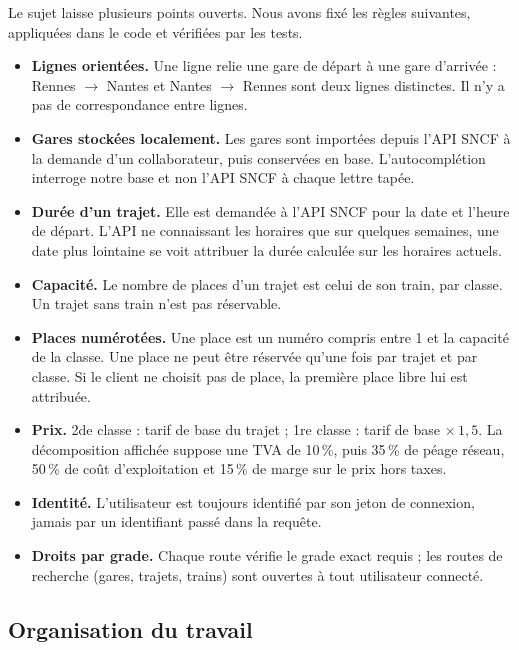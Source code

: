 \documentclass[11pt,a4paper]{article}
\begin{document}
Le sujet laisse plusieurs points ouverts. Nous avons fixé les règles suivantes, appliquées dans le
code et vérifiées par les tests.

\begin{itemize}[itemsep=2pt]
  \item \textbf{Lignes orientées.} Une ligne relie une gare de départ à une gare d'arrivée :
        Rennes $\rightarrow$ Nantes et Nantes $\rightarrow$ Rennes sont deux lignes distinctes.
        Il n'y a pas de correspondance entre lignes.
  \item \textbf{Gares stockées localement.} Les gares sont importées depuis l'API SNCF à la demande
        d'un collaborateur, puis conservées en base. L'autocomplétion interroge notre base et non
        l'API SNCF à chaque lettre tapée.
  \item \textbf{Durée d'un trajet.} Elle est demandée à l'API SNCF pour la date et l'heure de
        départ. L'API ne connaissant les horaires que sur quelques semaines, une date plus lointaine
        se voit attribuer la durée calculée sur les horaires actuels.
  \item \textbf{Capacité.} Le nombre de places d'un trajet est celui de son train, par classe. Un
        trajet sans train n'est pas réservable.
  \item \textbf{Places numérotées.} Une place est un numéro compris entre 1 et la capacité de la
        classe. Une place ne peut être réservée qu'une fois par trajet et par classe. Si le client
        ne choisit pas de place, la première place libre lui est attribuée.
  \item \textbf{Prix.} 2de classe : tarif de base du trajet ; 1re classe : tarif de base
        $\times\,1{,}5$. La décomposition affichée suppose une TVA de 10\,\%, puis 35\,\% de péage
        réseau, 50\,\% de coût d'exploitation et 15\,\% de marge sur le prix hors taxes.
  \item \textbf{Identité.} L'utilisateur est toujours identifié par son jeton de connexion, jamais
        par un identifiant passé dans la requête.
  \item \textbf{Droits par grade.} Chaque route vérifie le grade exact requis ; les routes de
        recherche (gares, trajets, trains) sont ouvertes à tout utilisateur connecté.
\end{itemize}

\subsection{Organisation du travail}
\end{document}
